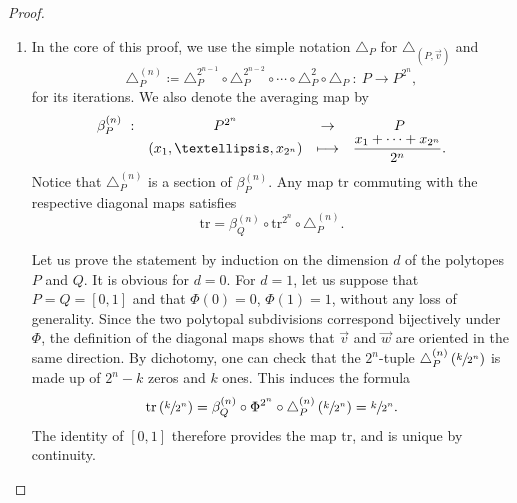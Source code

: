 \documentclass[10pt,a4paper]{amsart}
\numberwithin{equation}{section}\providecommand{\No}{}
\def\mto{\mathchoice{\longmapsto}{\mapsto}{\mapsto}{\mapsto}}
\let\dpl\displaystyle
\theoremstyle{plain}
\theoremstyle{definition}
\newcommand{\tr}{\mathrm{tr}}
\begin{document}
\begin{proof}
\begin{enumerate}
\item
In the core of this proof, we use the simple notation $\triangle_P$ for $\triangle_{(P, \vec v)}$ and
\[\triangle^{(n)}_P\coloneqq \triangle^{2^{n-1}}_P\circ \triangle^{2^{n-2}}_P\circ\cdots\circ\triangle^{2}_P\circ\triangle_P\ : \
P\to P^{2^{n}},\]
for its iterations.
We also denote the averaging map by
\begin{align*}
\begin{array}{rccc}
\beta^{(n)}_P\ : & P^{2^n}&\dpl\to &P\\
&(x_1, \ldots, x_{2^n}) & \dpl\mto&
\displaystyle \frac{x_1+\cdots+x_{2^n}}{2^n}.
\end{array}
\end{align*}
Notice that $\triangle^{(n)}_P$ is a section of $\beta^{(n)}_P$.
Any map $\tr$ commuting with the respective diagonal maps satisfies
\[\tr = \beta^{(n)}_Q\circ\tr^{2^n}\circ\triangle^{(n)}_P. \]

Let us prove the statement by induction on the dimension $d$ of the polytopes $P$ and $Q$. It is obvious for $d=0$. For $d=1$, let us suppose that $P=Q=[0,1]$ and that $\Phi(0)=0$, $\Phi(1)=1$, without any loss of generality.
Since the two polytopal subdivisions correspond bijectively under $\Phi$, the definition of the diagonal maps shows that $\vec v$ and $\vec w$ are oriented in the same direction. By dichotomy, one can check that the $2^n$-tuple $\triangle^{(n)}_P\left(\sfrac{k}{2^n}\right)$ is made up of $2^{n}-k$ zeros and $k$ ones. This induces the formula
\[\tr\left(\sfrac{k}{2^n}\right)
= \beta^{(n)}_Q\circ\Phi^{2^n}\circ\triangle^{(n)}_P\left(\sfrac{k}{2^n}\right)
= \sfrac{k}{2^n}. \]
The identity of $[0, 1]$ therefore provides the map $\tr$, and is unique by continuity.


\end{enumerate}
\end{proof}
\end{document}
